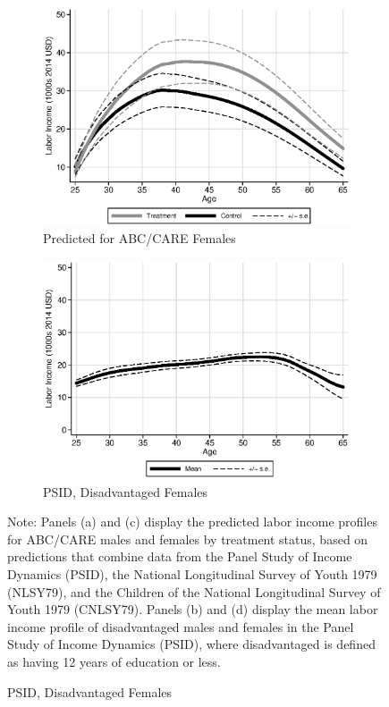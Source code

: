 \begin{figure}
\begin{subfigure}[h]{0.4\textwidth}
		\centering
		\caption{Predicted for ABC/CARE Females} \label{fig:abcare0}
		\includegraphics[width=\textwidth]{output/labor_25-60_female_1.eps}
\end{subfigure}%
\begin{subfigure}[h]{0.4\textwidth}
	\centering
	\caption{PSID, Disadvantaged Females} \label{fig:psid0}
		\includegraphics[width=\textwidth]{output/psid_incomeprofiles_s0.eps}
\end{subfigure}
\footnotesize \justify
Note: Panels (a) and (c) display the predicted labor income profiles for ABC/CARE males and females by treatment status, based on predictions that combine data from the Panel Study of Income Dynamics (PSID), the National Longitudinal Survey of Youth 1979 (NLSY79), and the Children of the National Longitudinal Survey of Youth 1979 (CNLSY79). Panels (b) and (d) display the mean labor income profile of disadvantaged males and females in the Panel Study of Income Dynamics (PSID), where disadvantaged is defined as having 12 years of education or less.\\
\end{figure}

